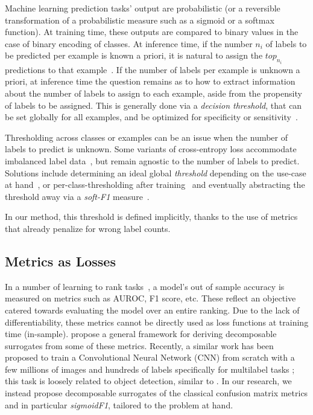Machine learning prediction tasks' output are probabilistic (or a reversible transformation of a probabilistic measure such as a sigmoid or a softmax function).
At training time, these outputs are compared to binary
values in the case of binary encoding of classes.
At inference time, if the number $n_i$ of labels to be predicted per example is known a priori, it is natural to assign the $top_{n_i}$ predictions to that example~\cite{lossTopKError, topKmulticlassSVM}.
If the number of labels per example is unknown a priori,  at inference time the question remains as to how to extract information about the number of labels to assign to each example, aside from the propensity of labels to be assigned.
This is generally done via a \emph{decision threshold}, that can be set globally for all examples, and be
optimized for specificity or sensitivity~\cite{decisionThreshold}.

Thresholding across classes or examples can be an issue when the number of labels to predict is unknown. Some variants of cross-entropy loss accommodate imbalanced label data~\cite{focalLoss}, but remain agnostic to the number of labels to predict.
Solutions include determining an ideal global \emph{threshold} depending on the use-case at hand~\cite{threshForF1}, or per-class-thresholding after training~\cite{moviePosters} and eventually abstracting the threshold away via a \emph{soft-F1} measure~\cite{softF1}.

In our method, this threshold is defined implicitly, thanks to the use of metrics that already penalize for
wrong label counts.


\subsection{Metrics as Losses}

In a number of learning to rank tasks~\cite{LTR}, a model's out of sample accuracy is measured on metrics such as AUROC, F1 score, etc. These reflect an objective catered towards evaluating the model over an entire ranking. Due to the lack of differentiability, these metrics cannot be directly used as loss
functions at training time (in-sample). \citet{optimizableLosses} propose a general framework for deriving
decomposable surrogates from some of these metrics.
Recently, a similar work has been proposed to train a Convolutional
Neural Network (CNN) from scratch with a few millions of images and hundreds
of labels specifically for multilabel tasks \cite{tencent}; this task is loosely related to object detection, similar to \cite{multitaskLabelImages}.
In our research, we instead propose decomposable surrogates of the classical confusion matrix metrics and in particular \emph{sigmoidF1}, tailored to the problem at hand.

